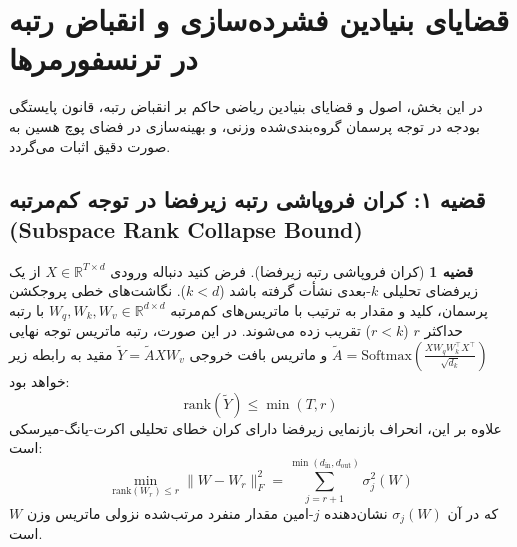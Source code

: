 \documentclass[12pt,a4paper]{report}
\theoremstyle{definition}
\newtheorem{theorem}{قضیه}[chapter]
\begin{document}
\section{قضایای بنیادین فشرده‌سازی و انقباض رتبه در ترنسفورمرها}
\label{sec:formal_theorems}
در این بخش، اصول و قضایای بنیادین ریاضی حاکم بر انقباض رتبه، قانون پایستگی بودجه در توجه پرسمان گروه‌بندی‌شده وزنی، و بهینه‌سازی در فضای پوچ هسین به صورت دقیق اثبات می‌گردد.

\subsection{قضیه ۱: کران فروپاشی رتبه زیرفضا در توجه کم‌مرتبه (Subspace Rank Collapse Bound)}
\begin{theorem}[کران فروپاشی رتبه زیرفضا]
\label{thm:subspace_collapse}
فرض کنید دنباله ورودی $X \in \mathbb{R}^{T \times d}$ از یک زیرفضای تحلیلی $k$-بعدی نشأت گرفته باشد ($k < d$). نگاشت‌های خطی پروجکشن پرسمان، کلید و مقدار به ترتیب با ماتریس‌های کم‌مرتبه $W_q, W_k, W_v \in \mathbb{R}^{d \times d}$ با رتبه حداکثر $r$ ($r < k$) تقریب زده می‌شوند. در این صورت، رتبه ماتریس توجه نهایی $\tilde{A} = \text{Softmax}\left(\frac{X W_q W_k^\top X^\top}{\sqrt{d_k}}\right)$ و ماتریس بافت خروجی $\tilde{Y} = \tilde{A} X W_v$ مقید به رابطه زیر خواهد بود:
\begin{equation}
\text{rank}(\tilde{Y}) \le \min(T, r)
\end{equation}
علاوه بر این، انحراف بازنمایی زیرفضا دارای کران خطای تحلیلی اکرت-یانگ-میرسکی است:
\begin{equation}
\min_{\text{rank}(W_r) \le r} \| W - W_r \|_F^2 = \sum_{j=r+1}^{\min(d_{\text{in}}, d_{\text{out}})} \sigma_j^2(W)
\end{equation}
که در آن $\sigma_j(W)$ نشان‌دهنده $j$-امین مقدار منفرد مرتب‌شده نزولی ماتریس وزن $W$ است.
\end{theorem}
\end{document}
